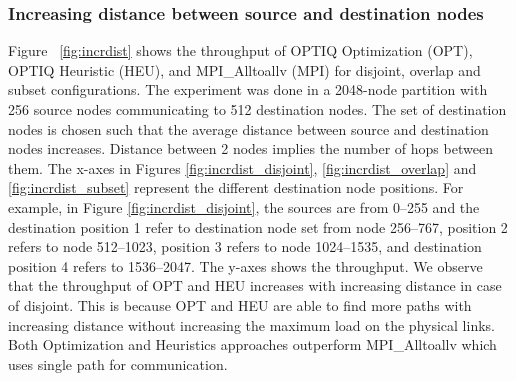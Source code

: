 \subsubsection{Increasing distance between source and destination nodes}

Figure ~\ref{fig:incrdist} shows the throughput of OPTIQ Optimization (OPT), OPTIQ Heuristic (HEU), and MPI\_Alltoallv (MPI) for disjoint, overlap and subset configurations. The experiment was done in a 2048-node partition with 256 source nodes communicating to 512 destination nodes. The set of destination nodes is chosen such that the average distance between source and destination nodes increases. Distance between 2 nodes implies the number of hops between them. The x-axes in Figures \ref{fig:incrdist_disjoint}, \ref{fig:incrdist_overlap} and \ref{fig:incrdist_subset} represent the different destination node positions. For example, in Figure \ref{fig:incrdist_disjoint}, the sources are from 0--255 and the destination position 1 refer to destination node set from node 256--767, position 2 refers to node 512--1023, position 3 refers to node 1024--1535, and destination position 4 refers to 1536--2047. The y-axes shows the throughput. We observe that the throughput of OPT and HEU increases with increasing distance in case of disjoint. This is because OPT and HEU are able to find more paths with increasing distance without increasing the maximum load on the physical links. Both Optimization and Heuristics approaches outperform MPI\_Alltoallv which uses single path for communication.
